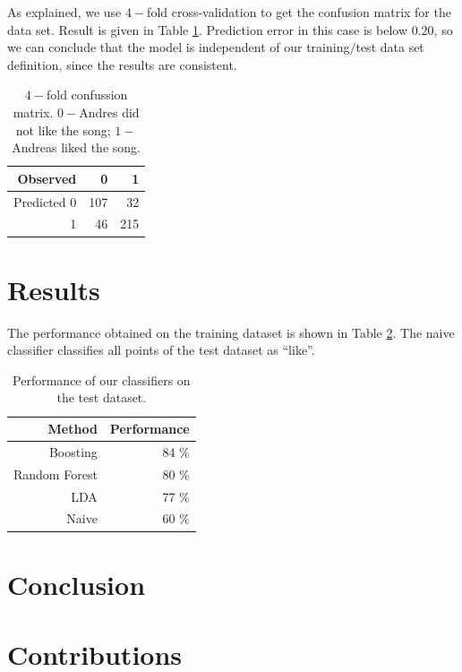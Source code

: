 \documentclass{article}
\begin{document}
As explained, we use $4-$fold cross-validation to get the confusion matrix for the data set. Result is given in Table \ref{tab:confussion_matrix}. Prediction error in this case is below $0.20$, so we can conclude that the model is independent of our training$/$test data set definition, since the results are consistent.

\begin {table}[h]
\begin{center}
\begin{tabular}{r|r|r}
  Observed & 0  & 1 \\
  \hline			
  Predicted 0 & 107 & 32 \\
  1 & 46 & 215 \\ 
\end{tabular}
\end{center}
\caption {$4-$fold confussion matrix. $0-$Andres did not like the song; $1-$Andreas liked the song.} 
\label{tab:confussion_matrix} 
\end {table}

\section{Results}

The performance obtained on the training dataset is shown in Table \ref{tab:performance}.
The naive classifier classifies all points of the test dataset as ``like''.

\begin {table}[h]
\begin{center}
\begin{tabular}{r|r}
  Method & Performance   \\
  \hline			
  Boosting & 84 \% \\
  Random Forest & 80 \% \\
  LDA & 77 \% \\
  Naive & 60 \%
\end{tabular}
\end{center}
\caption {Performance of our classifiers on the test dataset.} 
\label{tab:performance} 
\end {table}

\section{Conclusion}

\section{Contributions}
\end{document}
